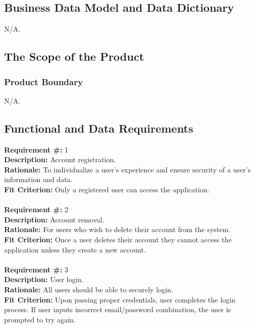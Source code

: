 \documentclass[12pt]{article}
\begin{document}
\subsection{Business Data Model and Data Dictionary}
N/A.

\subsection{The Scope of the Product}
\subsubsection{Product Boundary}
N/A.

\subsection{Functional and Data Requirements}
\textbf{Requirement \#:} 1
       \\
      \textbf{Description: }{Account registration.} \\
      \textbf{Rationale: }{To individualize a user's experience and ensure security of a user's information and data.} \\
      \textbf{Fit Criterion: }{Only a registered user can access the application.} \\ \\ 
\textbf{Requirement \#:} 2
       \\
      \textbf{Description: }{Account removal.} \\
      \textbf{Rationale: }{For users who wish to delete their account from the system.} \\
      \textbf{Fit Criterion: }{Once a user deletes their account they cannot access the application unless they create a new account.} \\ \\ 
\textbf{Requirement \#:} 3
       \\
      \textbf{Description: }{User login.} \\
      \textbf{Rationale: }{All users should be able to securely login.} \\
      \textbf{Fit Criterion: }{Upon passing proper credentials, user completes 
the login process. If user inputs incorrect email/password combination, the user is prompted to try again.} \\ \\
\end{document}
